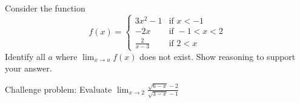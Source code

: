 \documentclass{ximera}
\begin{document}
\begin{exercise}
    Consider the function \[ f(x)=
    \begin{cases}
    3x^2-1 & \text{if }x<-1\\
    -2x & \text{if } -1<x<2\\
    \frac{2}{x-3} &\text{if } 2<x
    \end{cases}\]
    Identify all $a$ where $\displaystyle \lim_{x\rightarrow a} f(x)$ does not exist.  Show reasoning to support your answer.
\end{exercise}


\begin{exercise}

  Challenge problem: Evaluate $\displaystyle \lim_{x\rightarrow 2} \frac{\sqrt{6-x}-2}{\sqrt{3-x}-1} $
     

\end{exercise}
\end{document}
